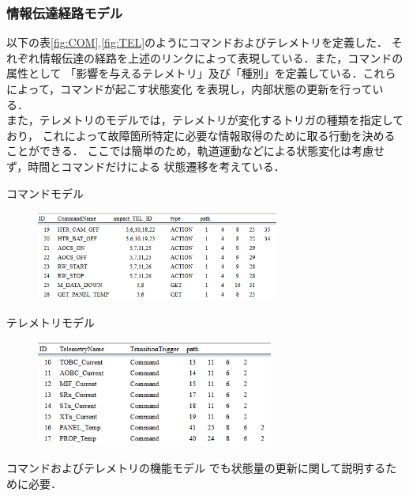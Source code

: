 \documentclass[11pt]{jsarticle}%
\begin{document}
\begin{multicols}{2}
\vspace{-2zh}
\subsubsection{情報伝達経路モデル}
以下の表\ref{fig:COM},\ref{fig:TEL}のようにコマンドおよびテレメトリを定義した．
それぞれ情報伝達の経路を上述のリンクによって表現している．また，コマンドの属性として
「影響を与えるテレメトリ」及び「種別」を定義している．これらによって，コマンドが起こす状態変化
を表現し，内部状態の更新を行っている．\\%
また，テレメトリのモデルでは，テレメトリが変化するトリガの種類を指定しており，
これによって故障箇所特定に必要な情報取得のために取る行動を決めることができる．
ここでは簡単のため，軌道運動などによる状態変化は考慮せず，時間とコマンドだけによる
状態遷移を考えている．

\begin{table}[H]
  \centering
  \caption{コマンドモデル}
  \label{fig:COM}
\end{table}
\vspace{-3zh}
\begin{figure}[H]
  \centering
    \includegraphics[width=8cm]{../figure/COM_resume.png}
\end{figure}

\begin{table}[H]
  \centering
  \caption{テレメトリモデル}
  \label{fig:TEL}
\end{table}
\vspace{-3zh}
\begin{figure}[H]
  \centering
    \includegraphics[height=3.5cm]{../figure/TEL_resume.png}
\end{figure}

コマンドおよびテレメトリの機能モデル%
でも状態量の更新に関して説明するために必要．


\end{multicols}
\end{document}
